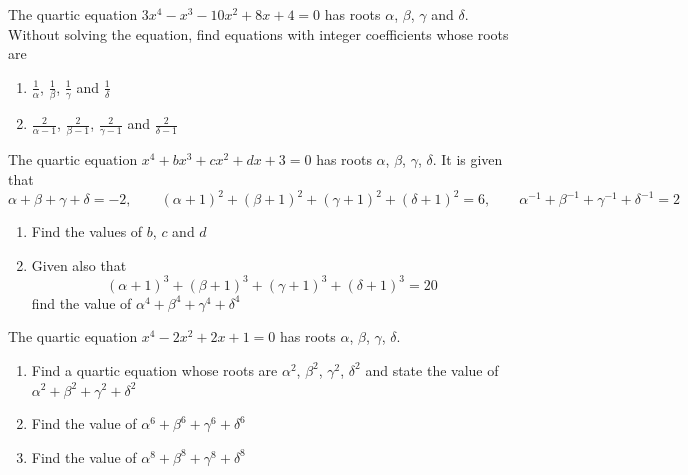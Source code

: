 \documentclass[leqno]{article}
\begin{document}
\begin{enumerate}[
  label=\textbf{\arabic*.},
  leftmargin=*,
  topsep=0pt,
  partopsep=0pt,
  parsep=0pt
]
\newpage

\questionitem

The quartic equation $3x^4 - x^3 - 10x^2 + 8x + 4 = 0$ has roots $\alpha$, $\beta$, $\gamma$ and $\delta$. \\

Without solving the equation, find equations with integer coefficients whose roots are \\
\begin{enumerate}[label=\textbf{(\alph*)}]
  \item $\frac{1}{\alpha}$, $\frac{1}{\beta}$, $\frac{1}{\gamma}$ and $\frac{1}{\delta}$  \\
  \item $\frac{2}{\alpha - 1}$, $\frac{2}{\beta - 1}$, $\frac{2}{\gamma - 1}$ and $\frac{2}{\delta - 1}$  \\
\end{enumerate}

\newpage

\questionitem

The quartic equation $x^4+bx^3+cx^2+dx+3=0$ has roots $\alpha$, $\beta$, $\gamma$, $\delta$. It is given that
\[
\alpha+\beta+\gamma+\delta=-2,\qquad (\alpha+1)^2+(\beta+1)^2+(\gamma+1)^2+(\delta+1)^2=6,\qquad \alpha^{-1}+\beta^{-1}+\gamma^{-1}+\delta^{-1}=2
\]
\begin{enumerate}[label=\textbf{(\alph*)}]
  \item Find the values of $b$, $c$ and $d$  \\
  \item Given also that
  \[
  (\alpha+1)^3+(\beta+1)^3+(\gamma+1)^3+(\delta+1)^3=20
  \]
  find the value of $\alpha^4+\beta^4+\gamma^4+\delta^4$  \\
\end{enumerate}

\newpage

\questionitem

The quartic equation $x^4-2x^2+2x+1=0$ has roots $\alpha$, $\beta$, $\gamma$, $\delta$. \\

\begin{enumerate}[label=\textbf{(\alph*)}]
  \item Find a quartic equation whose roots are $\alpha^2$, $\beta^2$, $\gamma^2$, $\delta^2$ and state the value of $\alpha^2+\beta^2+\gamma^2+\delta^2$  \\
  \item Find the value of $\alpha^6+\beta^6+\gamma^6+\delta^6$  \\
  \item Find the value of $\alpha^8+\beta^8+\gamma^8+\delta^8$  \\
\end{enumerate}


\end{enumerate}
\end{document}
